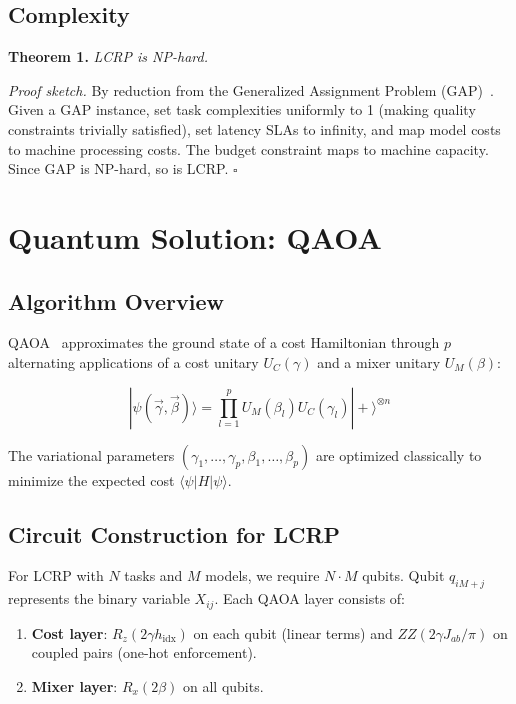 \documentclass[conference]{IEEEtran}
\begin{document}
\subsection{Complexity}

\textbf{Theorem 1.} \emph{LCRP is NP-hard.}

\emph{Proof sketch.} By reduction from the Generalized Assignment Problem (GAP)~\cite{martello1990knapsack}. Given a GAP instance, set task complexities uniformly to 1 (making quality constraints trivially satisfied), set latency SLAs to infinity, and map model costs to machine processing costs. The budget constraint maps to machine capacity. Since GAP is NP-hard, so is LCRP. \hfill $\square$

\section{Quantum Solution: QAOA}

\subsection{Algorithm Overview}

QAOA~\cite{farhi2014qaoa} approximates the ground state of a cost Hamiltonian through $p$ alternating applications of a cost unitary $U_C(\gamma)$ and a mixer unitary $U_M(\beta)$:

\begin{equation}
|\psi(\vec{\gamma}, \vec{\beta})\rangle = \prod_{l=1}^{p} U_M(\beta_l) U_C(\gamma_l) |+\rangle^{\otimes n}
\end{equation}

The variational parameters $(\gamma_1,\ldots,\gamma_p, \beta_1,\ldots,\beta_p)$ are optimized classically to minimize the expected cost $\langle\psi|H|\psi\rangle$.

\subsection{Circuit Construction for LCRP}

For LCRP with $N$ tasks and $M$ models, we require $N \cdot M$ qubits. Qubit $q_{iM+j}$ represents the binary variable $X_{ij}$. Each QAOA layer consists of:

\begin{enumerate}
    \item \textbf{Cost layer}: $R_z(2\gamma h_{\text{idx}})$ on each qubit (linear terms) and $ZZ(2\gamma J_{ab}/\pi)$ on coupled pairs (one-hot enforcement).
    \item \textbf{Mixer layer}: $R_x(2\beta)$ on all qubits.
\end{enumerate}
\end{document}
